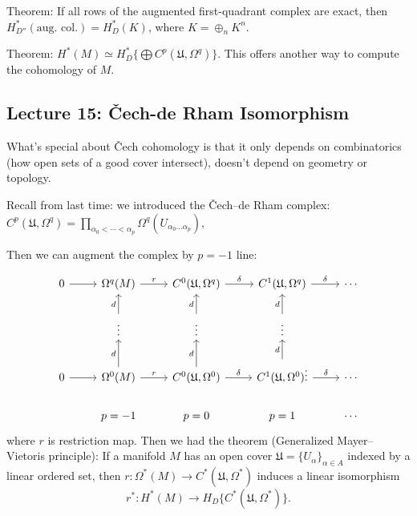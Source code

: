 \documentclass{article}
\theoremstyle{mystyle}
\theoremstyle{remark}
\numberwithin{equation}{section}
\begin{document}
Theorem: If all rows of the augmented first-quadrant complex are exact, then $H^*_{D''}(\text{aug. col.}) = H^*_D(K)$, where $K = \oplus_n K^n$. 

Theorem: $H^*(M) \simeq H^*_D\{\bigoplus C^p(\mathfrak{U},\Omega^q)\}$. This offers another way to compute the cohomology of $M$.




\subsection{Lecture 15: Čech-de Rham Isomorphism}

What's special about Čech cohomology is that it only depends on combinatorics (how open sets of a good cover intersect), doesn't depend on geometry or topology.


Recall from last time: we introduced the Čech--de Rham complex: $C^p(\mathfrak{U},\Omega^q) = \prod_{\alpha_0<\cdots< \alpha_p}
\Omega^q(U_{\alpha_0...\alpha_p})$,

Then we can augment the complex by $p=-1$ line:


$$\begin{tikzcd}
0\ar[r] & \Omega^q(M)\ar[r,"r"] & C^0(\mathfrak{U},\Omega^q)\ar[r,"\delta"] &C^1(\mathfrak{U},\Omega^q)\ar[r,"\delta"] & \cdots\\
&\vdots \ar[u,"d"] & \vdots \ar[u,"d"] &  \vdots \ar[u,"d"] &\\
0\ar[r] & \Omega^0(M)\ar[r,"r"] \ar[u,"d"] & C^0(\mathfrak{U},\Omega^0)\ar[u,"d"] \ar[r,"\delta"] &
C^1(\mathfrak{U},\Omega^0)\ar[r,"\delta"]  \vdots \ar[u,"d"]&\cdots\\
&p=-1& p=0& p=1 & \cdots
\end{tikzcd}
$$
where $r$ is restriction map. Then we had the theorem (Generalized Mayer--Vietoris principle): If a manifold $M$ has an open cover $\mathfrak{U} = \{U_\alpha\}_{\alpha \in A}$ indexed by a linear ordered set, then $r\colon \Omega^*(M)\rightarrow C^*(\mathfrak{U},\Omega^*)$ induces a linear isomorphism
$$r^*\colon H^*(M)\rightarrow H_D\{C^*(\mathfrak{U},\Omega^*)\}.$$
\end{document}
